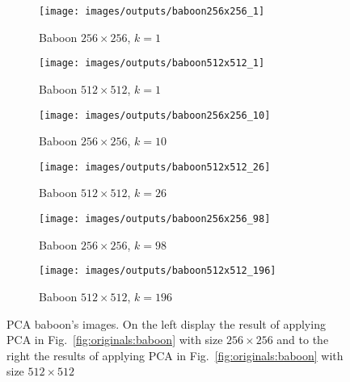 \documentclass[journal]{IEEEtran}
\begin{document}
\begin{figure}
	\centering
	\begin{subfigure}{0.23\textwidth}
		\centering
		\texttt{[image: images/outputs/baboon256x256\_1]} 
		\caption{Baboon $256\times 256$, $k=1$}
		\label{fig:outputs:baboon256_1} 
	\end{subfigure}
	\centering
	\begin{subfigure}{0.23\textwidth}
		\centering
		\texttt{[image: images/outputs/baboon512x512\_1]}
		\caption{Baboon $512\times 512$, $k=1$}
		\label{fig:outputs:baboon512_1}
	\end{subfigure}
	
	
	\centering
	\begin{subfigure}{0.23\textwidth}
		\centering
		\texttt{[image: images/outputs/baboon256x256\_10]} 
		\caption{Baboon $256\times 256$, $k=10$}
		\label{fig:outputs:baboon256_10} 
	\end{subfigure}
	\centering
	\begin{subfigure}{0.23\textwidth}
		\centering
		\texttt{[image: images/outputs/baboon512x512\_26]}
		\caption{Baboon $512\times 512$, $k=26$}
		\label{fig:outputs:baboon512_26}
	\end{subfigure}	
	
	\centering
	\begin{subfigure}{0.23\textwidth}
		\centering
		\texttt{[image: images/outputs/baboon256x256\_98]} 
		\caption{Baboon $256\times 256$, $k=98$}
		\label{fig:outputs:baboon256_98} 
	\end{subfigure}
	\centering
	\begin{subfigure}{0.23\textwidth}
		\centering
		\texttt{[image: images/outputs/baboon512x512\_196]}
		\caption{Baboon $512\times 512$, $k=196$}
		\label{fig:outputs:baboon512_196}
	\end{subfigure}	
	
	
	\caption{PCA baboon's images. On the left display the result of applying PCA in Fig.~\ref{fig:originals:baboon} with size $256\times 256$ and to the right the results of applying PCA in Fig.~\ref{fig:originals:baboon} with size $512\times 512$}
	\label{fig:outputs:baboon}
\end{figure}
\end{document}

